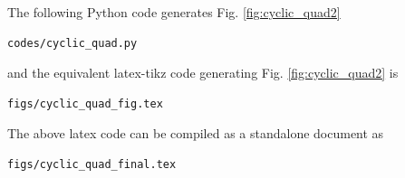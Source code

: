 \begin{enumerate}[label=\thesection.\arabic*.,ref=\thesection.\theenumi]
\solution The  following Python code generates Fig. \ref{fig:cyclic_quad2}

\begin{lstlisting}
codes/cyclic_quad.py
\end{lstlisting}

and the equivalent latex-tikz code generating Fig. \ref{fig:cyclic_quad2} is 
\begin{lstlisting}
figs/cyclic_quad_fig.tex
\end{lstlisting}
%
The above latex code can be compiled as a standalone document as
\begin{lstlisting}
figs/cyclic_quad_final.tex
\end{lstlisting}
\end{enumerate}

